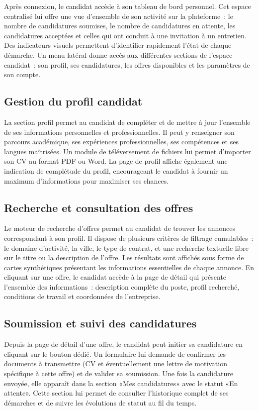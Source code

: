 \documentclass[12pt,a4paper]{report}
\begin{document}
Après connexion, le candidat accède à son tableau de bord personnel. Cet espace centralisé lui offre une vue d'ensemble de son activité sur la plateforme~: le nombre de candidatures soumises, le nombre de candidatures en attente, les candidatures acceptées et celles qui ont conduit à une invitation à un entretien. Des indicateurs visuels permettent d'identifier rapidement l'état de chaque démarche. Un menu latéral donne accès aux différentes sections de l'espace candidat~: son profil, ses candidatures, les offres disponibles et les paramètres de son compte.

\subsection{Gestion du profil candidat}

La section profil permet au candidat de compléter et de mettre à jour l'ensemble de ses informations personnelles et professionnelles. Il peut y renseigner son parcours académique, ses expériences professionnelles, ses compétences et ses langues maîtrisées. Un module de téléversement de fichiers lui permet d'importer son CV au format PDF ou Word. La page de profil affiche également une indication de complétude du profil, encourageant le candidat à fournir un maximum d'informations pour maximiser ses chances.

\subsection{Recherche et consultation des offres}

Le moteur de recherche d'offres permet au candidat de trouver les annonces correspondant à son profil. Il dispose de plusieurs critères de filtrage cumulables~: le domaine d'activité, la ville, le type de contrat, et une recherche textuelle libre sur le titre ou la description de l'offre. Les résultats sont affichés sous forme de cartes synthétiques présentant les informations essentielles de chaque annonce. En cliquant sur une offre, le candidat accède à la page de détail qui présente l'ensemble des informations~: description complète du poste, profil recherché, conditions de travail et coordonnées de l'entreprise.

\subsection{Soumission et suivi des candidatures}

Depuis la page de détail d'une offre, le candidat peut initier sa candidature en cliquant sur le bouton dédié. Un formulaire lui demande de confirmer les documents à transmettre (CV et éventuellement une lettre de motivation spécifique à cette offre) et de valider sa soumission. Une fois la candidature envoyée, elle apparaît dans la section «Mes candidatures» avec le statut «En attente». Cette section lui permet de consulter l'historique complet de ses démarches et de suivre les évolutions de statut au fil du temps.
\end{document}
